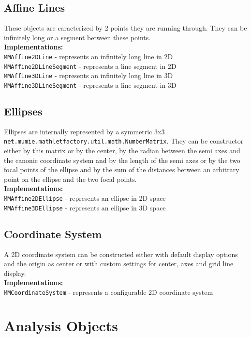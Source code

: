 \documentclass[a4paper,12pt]{book}
\begin{document}
\begin{appendix}
    \subsection{Affine Lines}
      These objects are caracterized by 2 points they are running through. They can be infinitely long or
      a segment between these points. \\
      {\bf Implementations:}\\
        \verb|MMAffine2DLine| - represents an infinitely long line in 2D\\
        \verb|MMAffine2DLineSegment| - represents a line segment in 2D\\
        \verb|MMAffine3DLine| - represents an infinitely long line in 3D\\
        \verb|MMAffine3DLineSegment| - represents a line segment in 3D
      
    \subsection{Ellipses}
       Ellipses are internally represented by a symmetric 3x3
       \verb|net.mumie.mathletfactory.util.math.NumberMatrix|.
       They can be constructor either by this matrix or by the center, by the radian between
       the semi axes and the canonic coordinate system and by the length of the semi axes or
       by the two focal points of the ellipse and by the sum of the distances between an arbitrary point 
       on the ellipse and the two focal points.\\
       {\bf Implementations:}\\
        \verb|MMAffine2DEllipse| - represents an ellipse in 2D space \\
        \verb|MMAffine3DEllipse| - represents an ellipse in 3D space
       
    \subsection{Coordinate System}
      A 2D coordinate system can be constructed either with default display options
      and the origin as center or with custom settings for center, axes and grid line display.\\
      {\bf Implementations:}\\
        \verb|MMCoordinateSystem| - represents a configurable 2D coordinate system
      
    
  \section{Analysis Objects}

\end{appendix}
\end{document}

